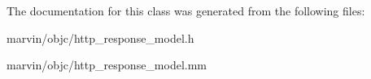 The documentation for this class was generated from the following files\+:\begin{DoxyCompactItemize}
\item 
marvin/objc/http\+\_\+response\+\_\+model.\+h\item 
marvin/objc/http\+\_\+response\+\_\+model.\+mm\end{DoxyCompactItemize}

